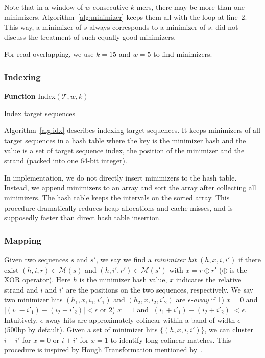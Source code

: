 \documentclass{bioinfo}
\begin{document}
\begin{methods}
Note that in a window of $w$ consecutive $k$-mers, there may be more than one
minimizers. Algorithm~\ref{alg:minimizer} keeps them all with the loop at line~2. This way, a
minimizer of $s$ always corresponds to a minimizer of $\overline{s}$.
\citet{Roberts:2004fv} did not discuss the treatment of such equally good
minimizers.

For read overlapping, we use $k=15$ and $w=5$ to find minimizers.

\subsubsection{Indexing}

\begin{algorithm}[tb]
\DontPrintSemicolon
\footnotesize
{}
\BlankLine
\textbf{Function} {\sc Index}$(\mathcal{T},w,k)$
\caption{Index target sequences}\label{alg:idx}
\end{algorithm}

Algorithm~\ref{alg:idx} describes indexing target sequences. It keeps minimizers of all target
sequences in a hash table where the key is the minimizer hash and the value is
a set of target sequence index, the position of the minimizer and the strand
(packed into one 64-bit integer).

In implementation, we do not directly insert minimizers to the hash table.
Instead, we append minimizers to an array and sort the array after collecting
all minimizers. The hash table keeps the intervals on the sorted array. This
procedure dramatically reduces heap allocations and cache misses, and is
supposedly faster than direct hash table insertion.

\subsubsection{Mapping}

Given two sequences $s$ and $s'$, we say we find a \emph{minimizer hit}
$(h,x,i,i')$ if there exist $(h,i,r)\in\mathcal{M}(s)$ and
$(h,i',r')\in\mathcal{M}(s')$ with $x=r\oplus r'$ ($\oplus$ is the XOR
operator). Here $h$ is the minimizer hash value, $x$ indicates the relative
strand and $i$ and $i'$ are the positions on the two sequences, respectively.
We say two minimizer hits $(h_1,x,i_1,i'_1)$ and $(h_2,x,i_2,i'_2)$ are
\emph{$\epsilon$-away} if 1) $x=0$ and $|(i_1-i'_1)-(i_2-i'_2)|<\epsilon$
or 2) $x=1$ and $|(i_1+i'_1)-(i_2+i'_2)|<\epsilon$. Intuitively,
$\epsilon$-away hits are approximately colinear within a band of width
$\epsilon$ (500bp by default).  Given a set of minimizer hits $\{(h,x,i,i')\}$, we can cluster
$i-i'$ for $x=0$ or $i+i'$ for $x=1$ to identify long colinear matches.
This procedure is inspired by Hough Transformation mentioned
by~\citet{sovic:2015aa}. 


\end{methods}
\end{document}
